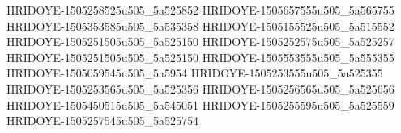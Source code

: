 HRIDOYE-1505258525u505_5a525852
HRIDOYE-1505657555u505_5a565755
HRIDOYE-1505353585u505_5a535358
HRIDOYE-1505155525u505_5a515552
HRIDOYE-1505251505u505_5a525150
HRIDOYE-1505252575u505_5a525257
HRIDOYE-1505251505u505_5a525150
HRIDOYE-1505553555u505_5a555355
HRIDOYE-1505059545u505_5a5954
HRIDOYE-1505253555u505_5a525355
HRIDOYE-1505253565u505_5a525356
HRIDOYE-1505256565u505_5a525656
HRIDOYE-1505450515u505_5a545051
HRIDOYE-1505255595u505_5a525559
HRIDOYE-1505257545u505_5a525754
